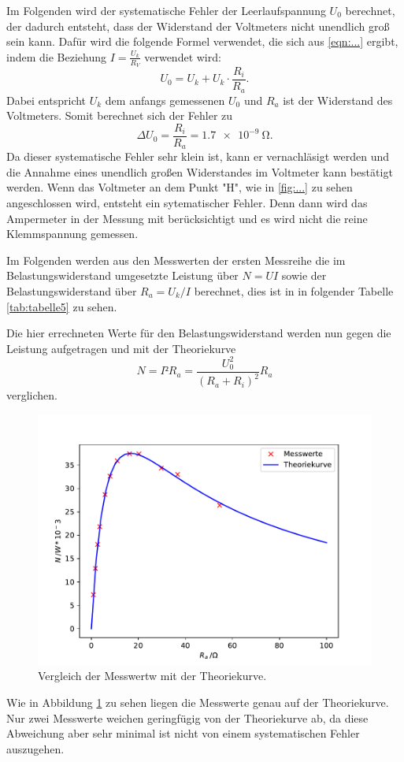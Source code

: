 \noindent Im Folgenden wird der systematische Fehler der Leerlaufspannung $U_{0}$ berechnet,
der dadurch entsteht, dass der Widerstand der Voltmeters nicht unendlich groß sein kann.
Dafür wird die folgende Formel verwendet, die sich aus \ref{eqn:...} ergibt, indem
die Beziehung $I=\frac{U_{k}}{R_{V}}$ verwendet wird:
\begin{equation}
  U_{0}=U_{k}+U_{k}\cdot \frac{R_{i}}{R_{a}}.
\end{equation}
Dabei entspricht $U_{k}$ dem anfangs gemessenen $U_{0}$ und $R_{a}$ ist der
Widerstand des Voltmeters. Somit berechnet sich der Fehler zu
\begin{equation}
  \Delta U_{0} = \frac{R_{i}}{R_{a}} = \SI{1.7e-9}{\ohm}.
\end{equation}
\noindent Da dieser systematische Fehler sehr klein ist, kann er vernachläsigt werden und die
Annahme eines unendlich großen Widerstandes im Voltmeter kann bestätigt werden.
Wenn das Voltmeter an dem Punkt "H", wie in \ref{fig:...}
zu sehen angeschlossen wird, entsteht ein sytematischer Fehler. Denn dann wird
das Ampermeter in der Messung mit berücksichtigt und es wird nicht die reine
Klemmspannung gemessen.

\noindent Im Folgenden werden aus den Messwerten der ersten Messreihe die
im Belastungswiderstand umgesetzte Leistung über $N=UI$ sowie der Belastungswiderstand
über $R_{a}=U_{k}/I$ berechnet, dies ist in in folgender Tabelle \ref{tab:tabelle5} zu sehen.

\noindent Die hier errechneten Werte für den Belastungswiderstand werden nun gegen
die Leistung aufgetragen und mit der Theoriekurve
\begin{equation*}
  N=I²R_{a}=\frac{U_{0}^2}{(R_{a}+R_{i})^2}R_{a}
\end{equation*}
verglichen.

\begin{figure}[H]
  \centering
  \includegraphics{plot5.pdf}
  \caption{Vergleich der Messwertw mit der Theoriekurve.}
  \label{fig:plot5}
\end{figure}
\noindent Wie in Abbildung \ref{fig:plot5} zu sehen liegen die Messwerte genau auf der
Theoriekurve. Nur zwei Messwerte weichen geringfügig von der Theoriekurve ab,
da diese Abweichung aber sehr minimal ist nicht von einem
systematischen Fehler auszugehen.

\label{sec:Auswertung}

